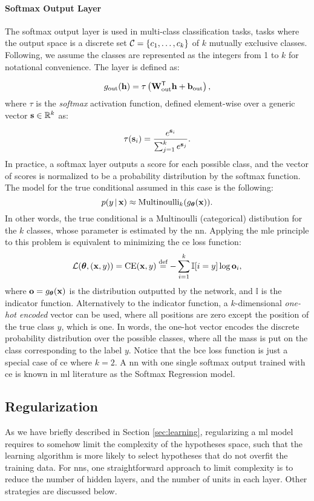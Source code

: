 \paragraph{Softmax Output Layer}
The softmax output layer is used in multi-class classification tasks, \ie tasks where the output space is a discrete set $\Cal{C} = \Set{c_1, \ldots, c_k}$ of $k$ mutually exclusive classes. Following, we assume the classes are represented as the integers from 1 to $k$ for notational convenience. The layer is defined as:

$$g_{\mathrm{out}}(\Vector{h}) = \tau \Paren{\Matrix{W}_{\mathrm{out}}^{\Transpose}\Vector{h} + \Vector{b}_{\mathrm{out}}},$$
where $\tau$ is the \emph{softmax} activation function, defined element-wise over a generic vector $\Vector{s} \in \Real^k$ as:

$$\tau(\Vector{s}_i) = \frac{e^{\Vector{s}_i}}{\sum_{j=1}^k e^{\Vector{s}_j}}.$$
In practice, a softmax layer outputs a score for each possible class, and the vector of scores is normalized to be a probability distribution by the softmax function. The model for the true conditional assumed in this case is the following:
$$p(y \given \Vector{x}) \approx \Fun{Multinoulli}_k(g_{\Param}(\Vector{x})).$$
In other words, the true conditional is a Multinoulli (categorical) distibution for the $k$ classes, whose parameter is estimated by the \gls{nn}. Applying the \gls{mle} principle to this problem is equivalent to minimizing the \gls{ce} loss function:
$$\Loss(\Param, (\Vector{x}, y)) = \mathrm{CE}(\Vector{x}, y) \defeq - \sum_{i=1}^k \mathbb{I}[i=y] \log \Vector{o}_i,$$
where $\Vector{o} = g_{\Param}(\Vector{x})$ is the distribution outputted by the network, and $\mathbb{I}$ is the indicator function. Alternatively to the indicator function, a $k$-dimensional \emph{one-hot encoded} vector can be used, where all positions are zero except the position of the true class $y$, which is one. In words, the one-hot vector encodes the discrete probability distribution over the possible classes, where all the mass is put on the class corresponding to the label $y$. Notice that the \gls{bce} loss function is just a special case of \gls{ce} where $k = 2$. A \gls{nn} with one single softmax output trained with \gls{ce} is known in \gls{ml} literature as the Softmax Regression model.

\subsection{Regularization}\label{sec:regularization}
As we have briefly described in Section \ref{sec:learning}, regularizing a \gls{ml} model requires to somehow limit the complexity of the hypotheses space, such that the learning algorithm is more likely to select hypotheses that do not overfit the training data. For \glspl{nn}, one straightforward approach to limit complexity is to reduce the number of hidden layers, and the number of units in each layer. Other strategies are discussed below.

